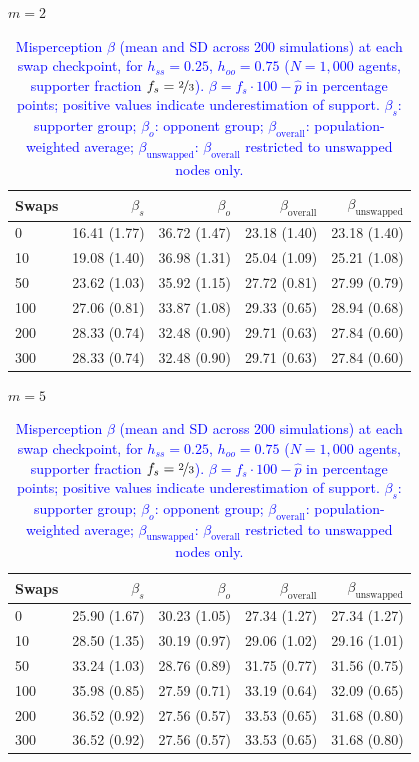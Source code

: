 \begin{table}[H]
\centering
\caption{\textcolor{blue}{Misperception $\beta$ (mean and SD across 200 simulations) at each swap checkpoint, for $h_{ss} = 0.25$, $h_{oo} = 0.75$ ($N = 1{,}000$ agents, supporter fraction $f_s = \nicefrac{2}{3}$). $\beta = f_s \cdot 100 - \hat{p}$ in percentage points; positive values indicate underestimation of support. $\beta_s$: supporter group; $\beta_o$: opponent group; $\beta_{\mathrm{overall}}$: population-weighted average; $\beta_{\mathrm{unswapped}}$: $\beta_{\mathrm{overall}}$ restricted to unswapped nodes only.}}
\label{tab:subset_fs0667_hss250_hoo750}
\par\medskip
\noindent\textit{$m = 2$}\\[2pt]
\begin{tabular}{l rrrr}
\toprule
Swaps & $\beta_s$ & $\beta_o$ & $\beta_{\mathrm{overall}}$ & $\beta_{\mathrm{unswapped}}$ \\
\midrule
0 & 16.41 (1.77) & 36.72 (1.47) & 23.18 (1.40) & 23.18 (1.40) \\
10 & 19.08 (1.40) & 36.98 (1.31) & 25.04 (1.09) & 25.21 (1.08) \\
50 & 23.62 (1.03) & 35.92 (1.15) & 27.72 (0.81) & 27.99 (0.79) \\
100 & 27.06 (0.81) & 33.87 (1.08) & 29.33 (0.65) & 28.94 (0.68) \\
200 & 28.33 (0.74) & 32.48 (0.90) & 29.71 (0.63) & 27.84 (0.60) \\
300 & 28.33 (0.74) & 32.48 (0.90) & 29.71 (0.63) & 27.84 (0.60) \\
\bottomrule
\end{tabular}
\par\medskip
\noindent\textit{$m = 5$}\\[2pt]
\begin{tabular}{l rrrr}
\toprule
Swaps & $\beta_s$ & $\beta_o$ & $\beta_{\mathrm{overall}}$ & $\beta_{\mathrm{unswapped}}$ \\
\midrule
0 & 25.90 (1.67) & 30.23 (1.05) & 27.34 (1.27) & 27.34 (1.27) \\
10 & 28.50 (1.35) & 30.19 (0.97) & 29.06 (1.02) & 29.16 (1.01) \\
50 & 33.24 (1.03) & 28.76 (0.89) & 31.75 (0.77) & 31.56 (0.75) \\
100 & 35.98 (0.85) & 27.59 (0.71) & 33.19 (0.64) & 32.09 (0.65) \\
200 & 36.52 (0.92) & 27.56 (0.57) & 33.53 (0.65) & 31.68 (0.80) \\
300 & 36.52 (0.92) & 27.56 (0.57) & 33.53 (0.65) & 31.68 (0.80) \\

\end{tabular}
\end{table}

